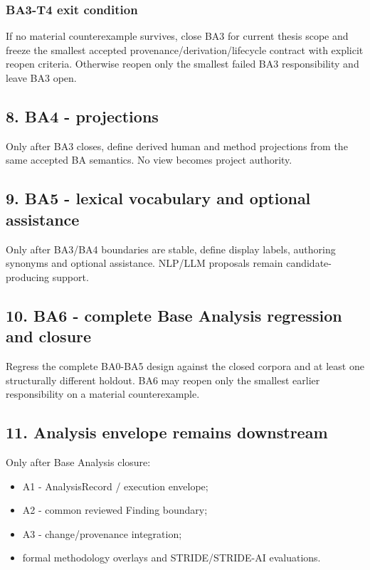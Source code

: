 \documentclass[11pt,a4paper]{article}
\providecommand{\tightlist}{\setlength{\itemsep}{0pt}\setlength{\parskip}{0pt}}
\begin{document}
\subsubsection{BA3-T4 exit condition}\label{ba3-t4-exit-condition}

If no material counterexample survives, close BA3 for current thesis
scope and freeze the smallest accepted provenance/derivation/lifecycle
contract with explicit reopen criteria. Otherwise reopen only the
smallest failed BA3 responsibility and leave BA3 open.

\subsection{8. BA4 - projections}\label{ba4---projections}

Only after BA3 closes, define derived human and method projections from
the same accepted BA semantics. No view becomes project authority.

\subsection{9. BA5 - lexical vocabulary and optional
assistance}\label{ba5---lexical-vocabulary-and-optional-assistance}

Only after BA3/BA4 boundaries are stable, define display labels,
authoring synonyms and optional assistance. NLP/LLM proposals remain
candidate-producing support.

\subsection{10. BA6 - complete Base Analysis regression and
closure}\label{ba6---complete-base-analysis-regression-and-closure}

Regress the complete BA0-BA5 design against the closed corpora and at
least one structurally different holdout. BA6 may reopen only the
smallest earlier responsibility on a material counterexample.

\subsection{11. Analysis envelope remains
downstream}\label{analysis-envelope-remains-downstream}

Only after Base Analysis closure:

\begin{itemize}
\tightlist
\item
  A1 - AnalysisRecord / execution envelope;
\item
  A2 - common reviewed Finding boundary;
\item
  A3 - change/provenance integration;
\item
  formal methodology overlays and STRIDE/STRIDE-AI evaluations.
\end{itemize}
\end{document}
